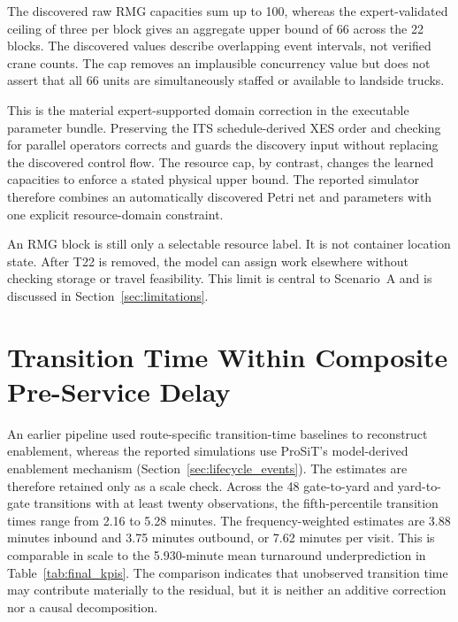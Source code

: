 The discovered raw RMG capacities sum up to 100, whereas the expert-validated ceiling of
three per block gives an aggregate upper bound of 66 across the 22 blocks. The
discovered values describe overlapping event intervals, not verified crane
counts. The cap removes an implausible concurrency value but does not assert
that all 66 units are simultaneously staffed or available to landside trucks.

This is the material expert-supported domain correction in the executable parameter bundle.
Preserving the ITS schedule-derived XES order and checking for parallel operators corrects and
guards the discovery input without replacing the discovered control flow. The
resource cap, by contrast, changes the learned capacities to enforce a stated
physical upper bound. The reported simulator therefore combines an automatically
discovered Petri net and parameters with one explicit resource-domain
constraint.

An RMG block is still only a selectable resource label. It is not container
location state. After T22 is removed, the model can assign work elsewhere
without checking storage or travel feasibility. This limit is central to
Scenario~A and is discussed in Section~\ref{sec:limitations}.

\section{Transition Time Within Composite Pre-Service Delay}
\label{sec:results_percentile_sens}

An earlier pipeline used route-specific transition-time baselines to
reconstruct enablement, whereas the reported simulations use ProSiT's
model-derived enablement mechanism (Section~\ref{sec:lifecycle_events}). The
estimates are therefore retained only as a scale check. Across the 48
gate-to-yard and yard-to-gate transitions with at least twenty observations,
the fifth-percentile transition times range from 2.16 to 5.28 minutes. The frequency-weighted estimates are 3.88 minutes inbound and 3.75 minutes outbound, or 7.62 minutes per visit. This is comparable in scale to the 5.930-minute mean turnaround underprediction in
Table~\ref{tab:final_kpis}. The comparison indicates that unobserved transition
time may contribute materially to the residual, but it is neither an additive
correction nor a causal decomposition.

